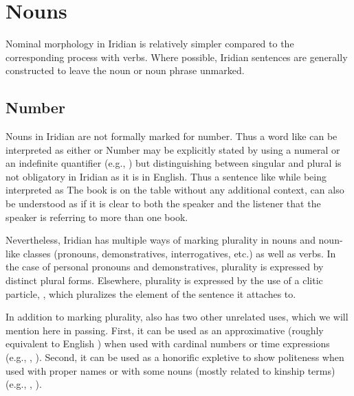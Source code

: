 \chapter{Nouns}

Nominal morphology in Iridian is relatively simpler compared to the
corresponding process with verbs. Where possible, Iridian sentences are
generally constructed to leave the noun or noun phrase unmarked.

\section{Number}\label{sec:number}

Nouns in Iridian are not formally marked for number. Thus a word like
 can be interpreted as either  or 
Number may be explicitly stated by using a numeral or an indefinite quantifier
(e.g.,    ) but distinguishing between
singular and plural is not obligatory in Iridian as it is in English. Thus a
sentence like  while being interpreted as {The book is on the
table} without any additional context, can also be understood as  if it is clear to both the speaker and the listener that the
speaker is referring to more than one book.

Nevertheless, Iridian has multiple ways of marking plurality in nouns and
noun-like classes (pronouns, demonstratives, interrogatives, etc.) as well as
verbs. In the case of personal pronouns and demonstratives, plurality is
expressed by distinct plural forms. Elsewhere, plurality is expressed by the use
of a clitic particle, , which pluralizes the element of the sentence it
attaches to. 

In addition to marking plurality,  also has two other unrelated uses,
which we will mention here in passing. First, it can be used as an approximative
 (roughly equivalent to English ) when used
with cardinal numbers or time expressions (e.g., , ). Second, it can be
used as a honorific expletive  to show
politeness when used with proper names or with some nouns
(mostly related to kinship terms) (e.g., , ).

